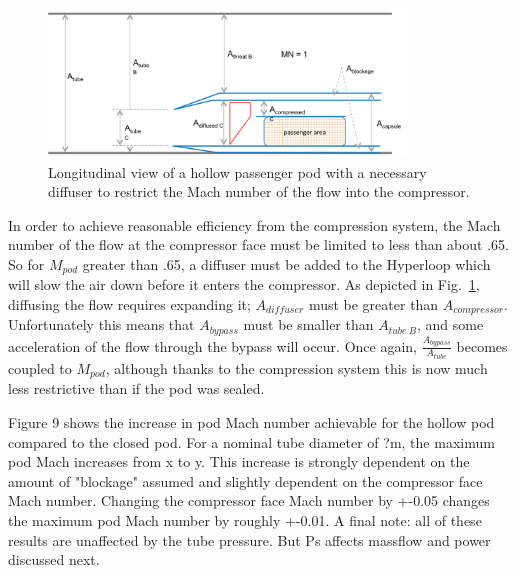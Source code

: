 \documentclass[heading.tex]{subfiles}
\begin{document}
\begin{figure}[hbtp]
\centering
\includegraphics[width=0.85\textwidth]{images/inletCapsule.png}
\caption{Longitudinal view of a hollow passenger pod with a necessary diffuser to restrict the Mach number of the flow into the compressor.}
\label{f:OpenPod}
\end{figure}

In order to achieve reasonable efficiency from the compression system, the Mach number of the flow at the compressor face
must be limited to less than about .65. So for $M_{pod}$ greater than .65, a diffuser must be added to the Hyperloop 
which will slow the air down before it enters the compressor. As depicted in Fig.~\ref{f:OpenPod}, diffusing the flow 
requires expanding it; $A_{diffuser}$ must be greater than $A_{compressor}$. Unfortunately this means that
$A_{bypass}$ must be smaller than $A_{tube\ B}$, and some acceleration of the flow through the 
bypass will occur. Once again, $\frac{A_{bypass}}{A_{tube}}$ becomes coupled to $M_{pod}$, although thanks to the compression 
system this is now much less restrictive than if the pod was sealed. 

Figure 9 shows the increase in pod Mach number achievable for the hollow pod compared to the closed pod. For a nominal tube diameter of ?m, the maximum pod Mach increases from x to y. This increase is strongly dependent on the amount of "blockage" assumed and slightly dependent on the compressor face Mach number. Changing the compressor face Mach number by +-0.05 changes the maximum pod Mach number by roughly +-0.01.
A final note: all of these results are unaffected by the tube pressure. But Ps affects massflow and power discussed next.
\end{document}

